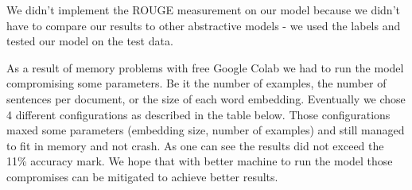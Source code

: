 \documentclass{article}
\begin{document}
We didn't implement the ROUGE measurement on our model because we didn't have to compare our results to other abstractive models - we used the labels and tested our model on the test data.

As a result of memory problems with free Google Colab we had to run the model compromising some parameters. Be it the number of examples, the number of sentences per document, or the size of each word embedding. Eventually we chose 4 different configurations as described in the table below. Those configurations maxed some parameters (embedding size, number of examples) and still managed to fit in memory and not crash. As one can see the results did not exceed the 11\% accuracy mark. We hope that with better machine to run the model those compromises can be mitigated to achieve better results.
\end{document}
